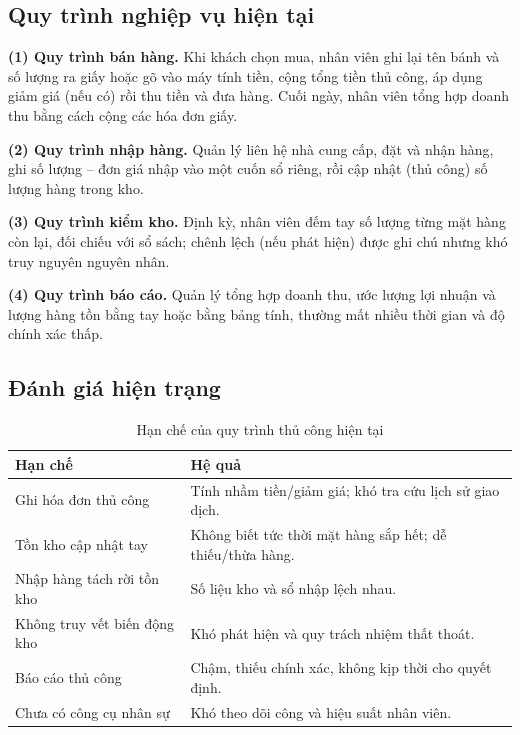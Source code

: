 \documentclass[12pt,a4paper]{report}
\begin{document}
\subsection{Quy trình nghiệp vụ hiện tại}

\textbf{(1) Quy trình bán hàng.} Khi khách chọn mua, nhân viên ghi lại tên bánh và số lượng ra giấy hoặc gõ vào máy tính tiền, cộng tổng tiền thủ công, áp dụng giảm giá (nếu có) rồi thu tiền và đưa hàng. Cuối ngày, nhân viên tổng hợp doanh thu bằng cách cộng các hóa đơn giấy.

\textbf{(2) Quy trình nhập hàng.} Quản lý liên hệ nhà cung cấp, đặt và nhận hàng, ghi số lượng -- đơn giá nhập vào một cuốn sổ riêng, rồi cập nhật (thủ công) số lượng hàng trong kho.

\textbf{(3) Quy trình kiểm kho.} Định kỳ, nhân viên đếm tay số lượng từng mặt hàng còn lại, đối chiếu với sổ sách; chênh lệch (nếu phát hiện) được ghi chú nhưng khó truy nguyên nguyên nhân.

\textbf{(4) Quy trình báo cáo.} Quản lý tổng hợp doanh thu, ước lượng lợi nhuận và lượng hàng tồn bằng tay hoặc bằng bảng tính, thường mất nhiều thời gian và độ chính xác thấp.

\subsection{Đánh giá hiện trạng}
\begin{table}[H]
\centering\small
\begin{tabularx}{\textwidth}{|L{4cm}|X|}
\hline
\textbf{Hạn chế} & \textbf{Hệ quả} \\ \hline
Ghi hóa đơn thủ công & Tính nhầm tiền/giảm giá; khó tra cứu lịch sử giao dịch. \\ \hline
Tồn kho cập nhật tay & Không biết tức thời mặt hàng sắp hết; dễ thiếu/thừa hàng. \\ \hline
Nhập hàng tách rời tồn kho & Số liệu kho và sổ nhập lệch nhau. \\ \hline
Không truy vết biến động kho & Khó phát hiện và quy trách nhiệm thất thoát. \\ \hline
Báo cáo thủ công & Chậm, thiếu chính xác, không kịp thời cho quyết định. \\ \hline
Chưa có công cụ nhân sự & Khó theo dõi công và hiệu suất nhân viên. \\ \hline
\end{tabularx}
\caption{Hạn chế của quy trình thủ công hiện tại}
\end{table}
\end{document}
